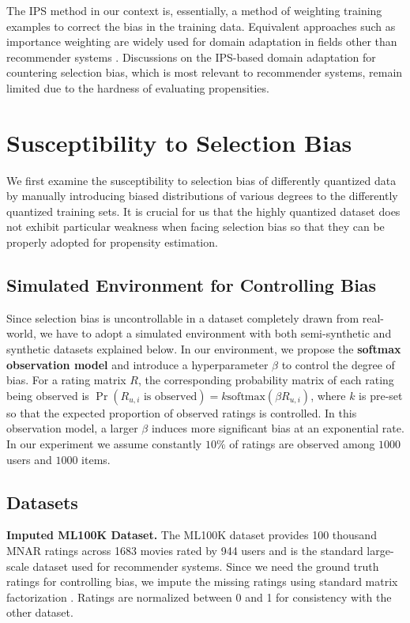 \documentclass{article}
\begin{document}
The IPS method in our context is, essentially, a method of weighting training examples to correct the bias in the training data. Equivalent approaches such as importance weighting are widely used for domain adaptation in fields other than recommender systems \cite{sugiyama2007covariate} \cite{zhang2018importance}. Discussions on the IPS-based domain adaptation for countering selection bias, which is most relevant to recommender systems, remain limited due to the hardness of evaluating propensities.

\section{Susceptibility to Selection Bias}
We first examine the susceptibility to selection bias of differently quantized data by manually introducing biased distributions of various degrees to the differently quantized training sets. It is crucial for us that the highly quantized dataset does not exhibit particular weakness when facing selection bias so that they can be properly adopted for propensity estimation.

\subsection{Simulated Environment for Controlling Bias}
Since selection bias is uncontrollable in a dataset completely drawn from real-world, we have to adopt a simulated environment \cite{krauth2020offline} with both semi-synthetic and synthetic datasets explained below. In our environment, we propose the \textbf{softmax observation model} and introduce a hyperparameter $\beta$ to control the degree of bias. For a rating matrix $R$, the corresponding probability matrix of each rating being observed is $\Pr(R_{u,i}\text{ is observed}) = k\text{softmax}(\beta R_{u,i})$, where $k$ is pre-set so that the expected proportion of observed ratings is controlled. In this observation model, a larger $\beta$ induces more significant bias at an exponential rate. In our experiment we assume constantly $10\%$ of ratings are observed among $1000$ users and $1000$ items.

\subsection{Datasets}
\textbf{Imputed ML100K Dataset.}
The ML100K dataset provides 100 thousand MNAR ratings across 1683 movies rated by 944 users and is the standard large-scale dataset used for recommender systems. Since we need the ground truth ratings for controlling bias, we impute the missing ratings using standard matrix factorization \cite{krauth2020offline}. Ratings are normalized between 0 and 1 for consistency with the other dataset. 
\end{document}
